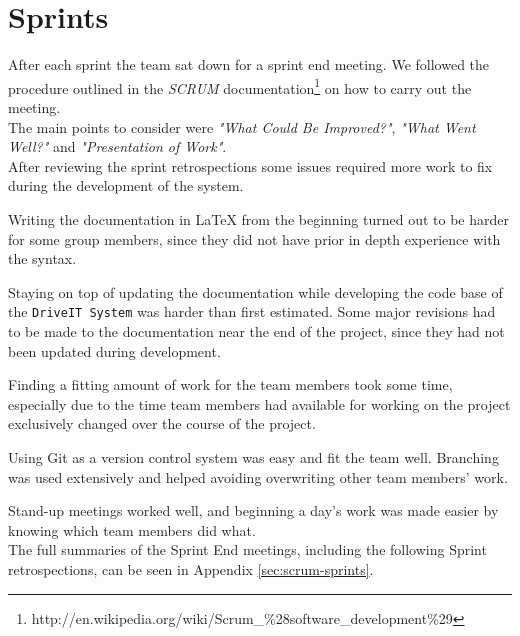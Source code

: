 \section{Sprints}
After each sprint the team sat down for a sprint end meeting. We followed the procedure outlined in the \textit{SCRUM} documentation\footnote{http://en.wikipedia.org/wiki/Scrum\_\%28software\_development\%29} on how to carry out the meeting.\\

The main points to consider were \textit{"What Could Be Improved?"}, \textit{"What Went Well?"} and \textit{"Presentation of Work"}.\\

After reviewing the sprint retrospections some issues required more work to fix during the development of the system.

Writing the documentation in LaTeX from the beginning turned out to be harder for some group members, since they did not have prior in depth experience with the syntax. 

Staying on top of updating the documentation while developing the code base of the \texttt{DriveIT System} was harder than first estimated. Some major revisions had to be made to the documentation near the end of the project, since they had not been updated during development.

Finding a fitting amount of work for the team members took some time, especially due to the time team members had available for working on the project exclusively changed over the course of the project.

Using Git as a version control system was easy and fit the team well. Branching was used extensively and helped avoiding overwriting other team members' work. 

Stand-up meetings worked well, and beginning a day's work was made easier by knowing which team members did what. \\

The full summaries of the Sprint End meetings, including the following Sprint retrospections, can be seen in Appendix \ref{sec:scrum-sprints}.
